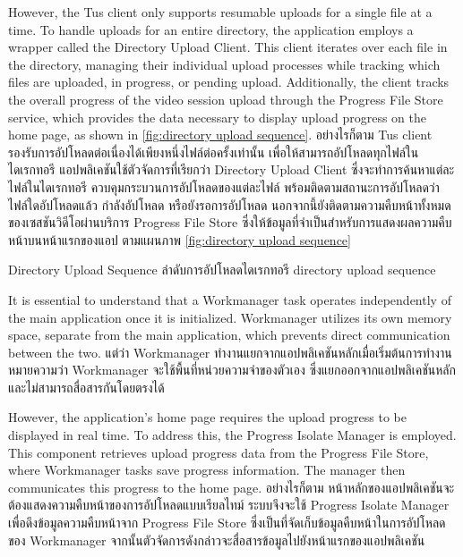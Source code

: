\ifenglish
However, the Tus client only supports resumable uploads for a single file at a time. To handle uploads for an entire directory, the application employs a wrapper called the Directory Upload Client. This client iterates over each file in the directory, managing their individual upload processes while tracking which files are uploaded, in progress, or pending upload. Additionally, the client tracks the overall progress of the video session upload through the Progress File Store service, which provides the data necessary to display upload progress on the home page, as shown in \autoref{fig:directory upload sequence}.
\else
อย่างไรก็ตาม Tus client รองรับการอัปโหลดต่อเนื่องได้เพียงหนึ่งไฟล์ต่อครั้งเท่านั้น เพื่อให้สามารถอัปโหลดทุกไฟล์ในไดเรกทอรี แอปพลิเคชันใช้ตัวจัดการที่เรียกว่า Directory Upload Client ซึ่งจะทำการค้นหาแต่ละไฟล์ในไดเรกทอรี ควบคุมกระบวนการอัปโหลดของแต่ละไฟล์ พร้อมติดตามสถานะการอัปโหลดว่า ไฟล์ใดอัปโหลดแล้ว กำลังอัปโหลด หรือยังรอการอัปโหลด นอกจากนี้ยังติดตามความคืบหน้าทั้งหมดของเซสชันวิดีโอผ่านบริการ Progress File Store ซึ่งให้ข้อมูลที่จำเป็นสำหรับการแสดงผลความคืบหน้าบนหน้าแรกของแอป ตามแผนภาพ \autoref{fig:directory upload sequence}
\fi

{\ifenglish Directory Upload Sequence \else ลำดับการอัปโหลดไดเรกทอรี \fi}
{directory upload sequence}

\ifenglish
It is essential to understand that a Workmanager task operates independently of the main application once it is initialized. Workmanager utilizes its own memory space, separate from the main application, which prevents direct communication between the two.
\else
แต่ว่า Workmanager ทำงานแยกจากแอปพลิเคชันหลักเมื่อเริ่มต้นการทำงาน หมายความว่า Workmanager จะใช้พื้นที่หน่วยความจำของตัวเอง ซึ่งแยกออกจากแอปพลิเคชันหลัก และไม่สามารถสื่อสารกันโดยตรงได้
\fi

\ifenglish
However, the application's home page requires the upload progress to be displayed in real time. To address this, the Progress Isolate Manager is employed. This component retrieves upload progress data from the Progress File Store, where Workmanager tasks save progress information. The manager then communicates this progress to the home page.
\else
อย่างไรก็ตาม หน้าหลักของแอปพลิเคชันจะต้องแสดงความคืบหน้าของการอัปโหลดแบบเรียลไทม์ ระบบจึงจะใช้ Progress Isolate Manager เพื่อดึงข้อมูลความคืบหน้าจาก Progress File Store ซึ่งเป็นที่จัดเก็บข้อมูลคืบหน้าในการอัปโหลดของ Workmanager จากนั้นตัวจัดการดังกล่าวจะสื่อสารข้อมูลไปยังหน้าแรกของแอปพลิเคชัน
\fi

